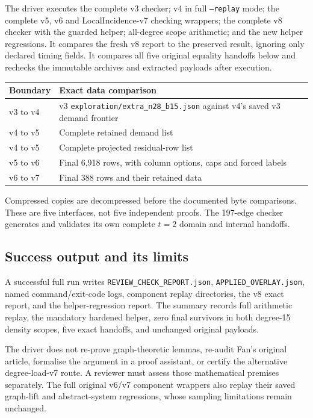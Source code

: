 \documentclass[11pt,a4paper]{article}
\begin{document}
The driver executes the complete v3 checker; v4 in full \texttt{--replay} mode; the complete v5, v6 and LocalIncidence-v7 checking wrappers; the complete v8 checker with the guarded helper; all-degree scope arithmetic; and the new helper regressions. It compares the fresh v8 report to the preserved result, ignoring only declared timing fields. It compares all five original equality handoffs below and rechecks the immutable archives and extracted payloads after execution.

\begin{center}\small\begin{tabular}{p{28mm}p{107mm}}\toprule
Boundary&Exact data comparison\\\midrule
v3 to v4&v3 \texttt{exploration/extra\_n28\_b15.json} against v4's saved v3 demand frontier\\
v4 to v5&Complete retained demand list\\
v4 to v5&Complete projected residual-row list\\
v5 to v6&Final 6,918 rows, with column options, caps and forced labels\\
v6 to v7&Final 388 rows and their retained data\\\bottomrule
\end{tabular}\end{center}
Compressed copies are decompressed before the documented byte comparisons. These are five interfaces, not five independent proofs. The 197-edge checker generates and validates its own complete $t=2$ domain and internal handoffs.

\subsection{Success output and its limits}
A successful full run writes \texttt{REVIEW\_CHECK\_REPORT.json}, \texttt{APPLIED\_OVERLAY.json}, named command/exit-code logs, component replay directories, the v8 exact report, and the helper-regression report. The summary records full arithmetic replay, the mandatory hardened helper, zero final survivors in both degree-15 density scopes, five exact handoffs, and unchanged original payloads.

The driver does not re-prove graph-theoretic lemmas, re-audit Fan's original article, formalise the argument in a proof assistant, or certify the alternative degree-load-v7 route. A reviewer must assess those mathematical premises separately. The full original v6/v7 component wrappers also replay their saved graph-lift and abstract-system regressions, whose sampling limitations remain unchanged.
\end{document}
